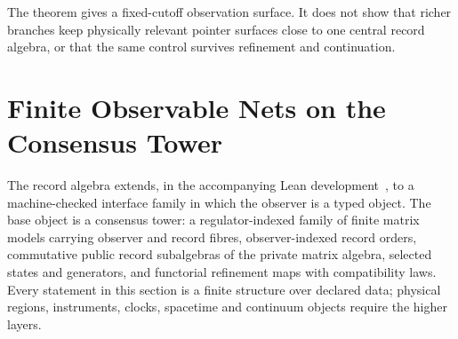 \documentclass[11pt]{article}
\theoremstyle{remark}
\theoremstyle{plain}
\begin{document}
The theorem gives a fixed-cutoff observation surface. It does not show
that richer branches keep physically relevant pointer surfaces close to one
central record algebra, or that the same control survives refinement and
continuation.

\section{Finite Observable Nets on the Consensus Tower}
\label{sec:finite-observable-nets}
\label{sec:operational-observer-layer}

The record algebra extends, in the accompanying Lean
development~\cite{ophrepo}, to a machine-checked interface family in which
the observer is a typed object. The base object is a consensus tower: a
regulator-indexed family of finite matrix models carrying observer and
record fibres, observer-indexed record orders, commutative public record
subalgebras of the private matrix algebra, selected states and generators,
and functorial refinement maps with compatibility laws. Every statement in
this section is a finite structure over declared data; physical regions,
instruments, clocks, spacetime and continuum objects require the higher
layers.
\end{document}
